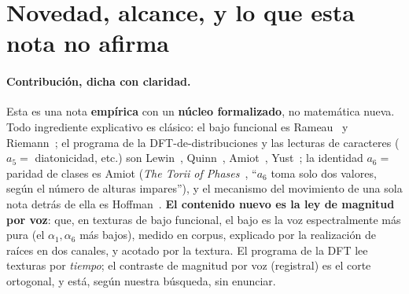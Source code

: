\documentclass[11pt]{article}
\begin{document}
\section{Novedad, alcance, y lo que esta nota no afirma}\label{sec:novelty}

\paragraph{Contribución, dicha con claridad.} Esta es una nota \textbf{empírica} con un \textbf{núcleo
formalizado}, no matemática nueva. Todo ingrediente explicativo es clásico: el bajo funcional es
Rameau~\cite{Rameau} y Riemann~\cite{Riemann}; el programa de la DFT-de-distribuciones y las lecturas de
caracteres ($a_5=$ diatonicidad, etc.) son Lewin~\cite{Lewin1959}, Quinn~\cite{Quinn}, Amiot~\cite{Amiot},
Yust~\cite{Yust2017,Yust2019}; la identidad $a_6=$ paridad de clases es Amiot (\emph{The Torii of
Phases}~\cite{Torii}, ``$a_6$ toma solo dos valores, según el número de alturas impares''), y el mecanismo
del movimiento de una sola nota detrás de ella es Hoffman~\cite{Hoffman}. \textbf{El contenido nuevo es la
ley de magnitud por voz}: que, en texturas de bajo funcional, el bajo es la voz espectralmente más pura (el
$\alpha_1,\alpha_6$ más bajos), medido en corpus, explicado por la realización de raíces en dos canales, y
acotado por la textura. El programa de la DFT lee texturas por \emph{tiempo}; el contraste de magnitud por
voz (registral) es el corte ortogonal, y está, según nuestra búsqueda, sin enunciar.
\end{document}
